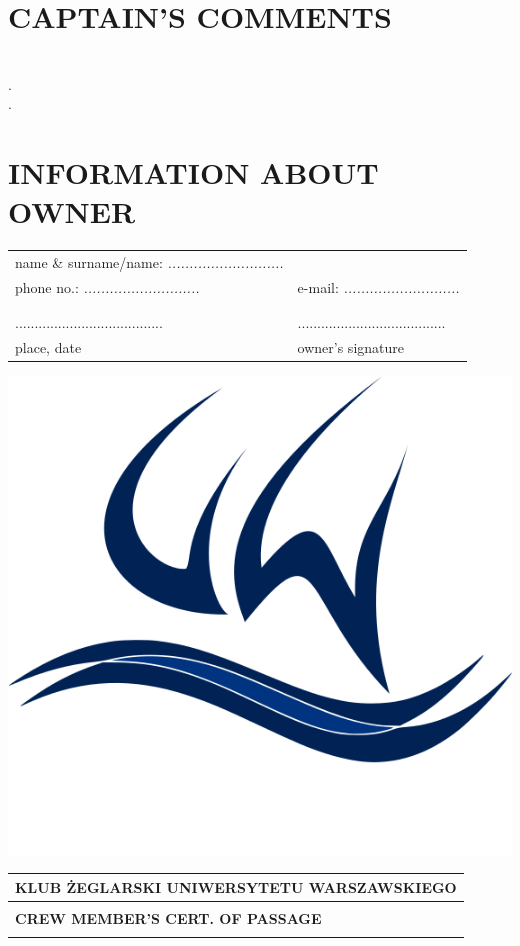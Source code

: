 \documentclass{article}
\begin{document}
    
\section*{CAPTAIN'S COMMENTS}


\textit{}\dotfill \\
.\dotfill \\
.\dotfill \\
\section*{INFORMATION ABOUT OWNER}

\begin{tabularx}{\textwidth}{X X}
name \& surname/name: \textit{...........................} \\
phone no.: \textit{...........................} & e-mail: \textit{...........................}\\
\\\\
...................................... & ......................................\\
place, date & owner's signature\\
\end{tabularx}
\newpage
\begin{minipage}{0.11\textwidth}
\includegraphics[width=\textwidth]{logo.png}
\end{minipage}
\begin{minipage}{0.89\textwidth}
\begin{tabularx}{\textwidth} { 
  | >{\centering\arraybackslash}X | }
 \hline
 \textbf{KLUB ŻEGLARSKI UNIWERSYTETU WARSZAWSKIEGO} \\
 \hline
 \\
 \textbf{\huge CREW MEMBER'S CERT. OF PASSAGE} \\
 \\
\hline
\end{tabularx}
\end{minipage}
\end{document}
